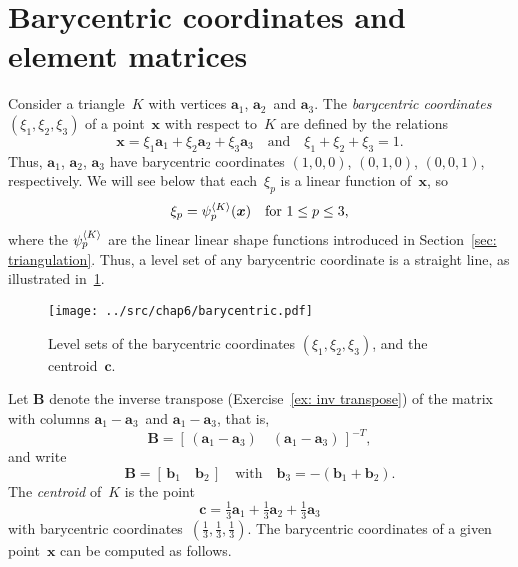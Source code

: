 \section{Barycentric coordinates and element matrices}\label{sec: barycentric}

Consider a triangle~$K$ with vertices $\boldsymbol{a}_1$, 
$\boldsymbol{a}_2$~and $\boldsymbol{a}_3$.  The \emph{barycentric coordinates} 
$(\xi_1,\xi_2,\xi_3)$ of a point~$\boldsymbol{x}$ with respect to~$K$ are 
defined by the relations
\[
\boldsymbol{x}=\xi_1\boldsymbol{a}_1+\xi_2\boldsymbol{a}_2
    +\xi_3\boldsymbol{a}_3
    \quad\text{and}\quad
\xi_1+\xi_2+\xi_3=1.    
\]
Thus, $\boldsymbol{a}_1$, $\boldsymbol{a}_2$, $\boldsymbol{a}_3$ have
barycentric coordinates $(1,0,0)$, $(0,1,0)$, $(0,0,1)$, respectively. We will 
see below that each~$\xi_p$ is a linear function of~$\boldsymbol{x}$, so 
\begin{equation}\label{eq: xi psi}
\xi_p=\psi_p^{\langle K\rangle}(\boldsymbol{x})
    \quad\text{for $1\le p\le 3$,}
\end{equation}
where the $\psi_p^{\langle K\rangle}$ are the linear linear shape functions introduced in 
Section~\ref{sec: triangulation}.  Thus, a level set of any
barycentric coordinate is a straight line, as illustrated 
in~\ref{fig: barycentric}.

\begin{figure}
\caption{Level sets of the barycentric coordinates 
$(\xi_1,\xi_2,\xi_3)$, and the centroid~$\boldsymbol{c}$.}
\label{fig: barycentric}
\begin{center}
\texttt{[image: ../src/chap6/barycentric.pdf]}
\end{center}
\end{figure}

Let $\boldsymbol{B}$ denote the inverse transpose 
(Exercise~\ref{ex: inv transpose}) of the matrix with columns 
$\boldsymbol{a}_1-\boldsymbol{a}_3$~and $\boldsymbol{a}_1-\boldsymbol{a}_3$, 
that is,
\[
\boldsymbol{B}=[\,(\boldsymbol{a}_1-\boldsymbol{a}_3)\quad
    (\boldsymbol{a}_1-\boldsymbol{a}_3)\,]^{-T},
\]
and write
\begin{equation}\label{eq: bp vector def}
\boldsymbol{B}=[\,\boldsymbol{b}_1\quad\boldsymbol{b}_2\,]
\quad\text{with}\quad\boldsymbol{b}_3=-(\boldsymbol{b}_1+\boldsymbol{b}_2).
\end{equation}
The \emph{centroid} of~$K$ is the point
\[
\boldsymbol{c}=\tfrac13\boldsymbol{a}_1+\tfrac13\boldsymbol{a}_2
+\tfrac13\boldsymbol{a}_3
\]
with barycentric coordinates~$(\tfrac13,\tfrac13,\tfrac13)$. The barycentric 
coordinates of a given point~$\boldsymbol{x}$ can be computed as follows.

